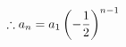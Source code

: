 \documentclass[preview]{standalone}
\begin{document}
\begin{align*}
\special{dvisvgm:raw <g id='unique000'>}\therefore a_n=a_1\left(-\frac{1}{2}\right)^{n-1}\special{dvisvgm:raw </g>}
\end{align*}
\end{document}
